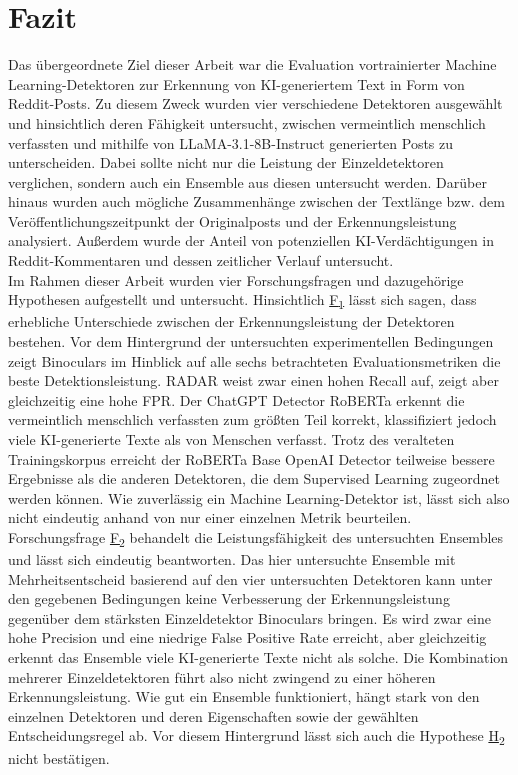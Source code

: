\chapter{Fazit}
\label{chap:conclusion}
Das übergeordnete Ziel dieser Arbeit war die Evaluation vortrainierter Machine Learning-Detektoren zur Erkennung von KI-generiertem Text in Form von Reddit-Posts. Zu diesem Zweck wurden vier verschiedene Detektoren ausgewählt und hinsichtlich deren Fähigkeit untersucht, zwischen vermeintlich menschlich verfassten und mithilfe von LLaMA-3.1-8B-Instruct generierten Posts zu unterscheiden. Dabei sollte nicht nur die Leistung der Einzeldetektoren verglichen, sondern auch ein Ensemble aus diesen untersucht werden. Darüber hinaus wurden auch mögliche Zusammenhänge zwischen der Textlänge bzw. dem Veröffentlichungszeitpunkt der Originalposts und der Erkennungsleistung analysiert. Außerdem wurde der Anteil von potenziellen KI-Verdächtigungen in Reddit-Kommentaren und dessen zeitlicher Verlauf untersucht. \\
Im Rahmen dieser Arbeit wurden vier Forschungsfragen und dazugehörige Hypothesen aufgestellt und untersucht. Hinsichtlich \hyperlink{rq:1}{F\textsubscript{1}} lässt sich sagen, dass erhebliche Unterschiede zwischen der Erkennungsleistung der Detektoren bestehen. Vor dem Hintergrund der untersuchten experimentellen Bedingungen zeigt Binoculars im Hinblick auf alle sechs betrachteten Evaluationsmetriken die beste Detektionsleistung. RADAR weist zwar einen hohen Recall auf, zeigt aber gleichzeitig eine hohe FPR. Der ChatGPT Detector RoBERTa erkennt die vermeintlich menschlich verfassten zum größten Teil korrekt, klassifiziert jedoch viele KI-generierte Texte als von Menschen verfasst. Trotz des veralteten Trainingskorpus erreicht der RoBERTa Base OpenAI Detector teilweise bessere Ergebnisse als die anderen Detektoren, die dem Supervised Learning zugeordnet werden können. Wie zuverlässig ein Machine Learning-Detektor ist, lässt sich also nicht eindeutig anhand von nur einer einzelnen Metrik beurteilen. \\
Forschungsfrage \hyperlink{rq:2}{F\textsubscript{2}} behandelt die Leistungsfähigkeit des untersuchten Ensembles und lässt sich eindeutig beantworten. Das hier untersuchte Ensemble mit Mehrheitsentscheid basierend auf den vier untersuchten Detektoren kann unter den gegebenen Bedingungen keine Verbesserung der Erkennungsleistung gegenüber dem stärksten Einzeldetektor Binoculars bringen. Es wird zwar eine hohe Precision und eine niedrige False Positive Rate erreicht, aber gleichzeitig erkennt das Ensemble viele KI-generierte Texte nicht als solche. Die Kombination mehrerer Einzeldetektoren führt also nicht zwingend zu einer höheren Erkennungsleistung. Wie gut ein Ensemble funktioniert, hängt stark von den einzelnen Detektoren und deren Eigenschaften sowie der gewählten Entscheidungsregel ab. Vor diesem Hintergrund lässt sich auch die Hypothese \hyperlink{hp:2}{H\textsubscript{2}} nicht bestätigen. \\
